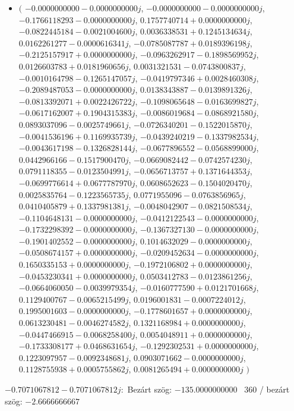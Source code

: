 \documentclass[14pt,a4paper]{article}
\begin{document}
\begin{itemize}
\item
$\big($
$-0.0000000000-0.0000000000j$, $-0.0000000000-0.0000000000j$, $-0.1766118293-0.0000000000j$, $0.1757740714+0.0000000000j$, $-0.0822445184-0.0021004600j$, $0.0036338531+0.1245134634j$, $0.0162261277-0.0000616341j$, $-0.0785087787+0.0189396198j$, $-0.2125157917+0.0000000000j$, $-0.0963262917-0.1898569952j$, $0.0126603783+0.0181960656j$, $0.0031321531-0.0743800837j$, $-0.0010164798-0.1265147057j$, $-0.0419797346+0.0028460308j$, $-0.2089487053-0.0000000000j$, $0.0138343887-0.0139891326j$, $-0.0813392071+0.0022426722j$, $-0.1098065648-0.0163699827j$, $-0.0617162007+0.1904315383j$, $-0.0086019684-0.0868921580j$, $0.0893037096-0.0025749661j$, $-0.0726340201-0.1522015870j$, $-0.0041536196+0.1169935739j$, $-0.0439240219-0.1337982534j$, $-0.0043617198-0.1326828144j$, $-0.0677896552-0.0568899000j$, $0.0442966166-0.1517900470j$, $-0.0669082442-0.0742574230j$, $0.0791118355-0.0123504991j$, $-0.0656713757+0.1371644353j$, $-0.0699776614+0.0677787970j$, $0.0608652623-0.1504020470j$, $0.0025835764-0.1223565735j$, $0.0771955096-0.0763856965j$, $0.0410405879+0.1337981381j$, $-0.0048042907-0.0821508534j$, $-0.1104648131-0.0000000000j$, $-0.0412122543-0.0000000000j$, $-0.1732298392-0.0000000000j$, $-0.1367327130-0.0000000000j$, $-0.1901402552-0.0000000000j$, $0.1014632029-0.0000000000j$, $-0.0508674157+0.0000000000j$, $-0.0209452634-0.0000000000j$, $0.1650335153+0.0000000000j$, $-0.1972106802+0.0000000000j$, $-0.0453230341+0.0000000000j$, $0.0503412783-0.0123861256j$, $-0.0664060050-0.0039979354j$, $-0.0160777590+0.0121701668j$, $0.1129400767-0.0065215499j$, $0.0196001831-0.0007224012j$, $0.1995001603-0.0000000000j$, $-0.1778601657+0.0000000000j$, $0.0613230481-0.0046274582j$, $0.1321168984+0.0000000000j$, $-0.0447466915-0.0068258400j$, $0.0054048911+0.0000000000j$, $-0.1733308177+0.0468631654j$, $-0.1292302531+0.0000000000j$, $0.1223097957-0.0092348681j$, $0.0903071662-0.0000000000j$, $0.1128755938+0.0005755862j$, $0.0081265494+0.0000000000j$
$\big)$
\end{itemize}
$-0.7071067812-0.7071067812j$:\
Bezárt szög: $-135.0000000000$ \
360 / bezárt szög: $-2.6666666667$\
\end{document}
